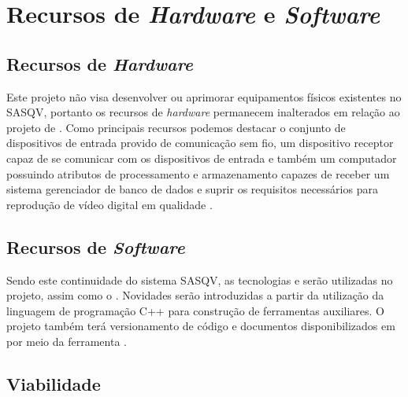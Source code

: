 \chapter{Recursos de \emph{Hardware} e \emph{Software}}

\section{Recursos de \emph{Hardware}}

Este projeto não visa desenvolver ou aprimorar equipamentos físicos existentes no SASQV, portanto os recursos de \emph{hardware} permanecem inalterados em relação ao projeto de \cite{sasqv}. Como principais recursos podemos destacar o conjunto de dispositivos de entrada provido de comunicação sem fio, um dispositivo receptor capaz de se comunicar com os dispositivos de entrada e também um computador possuindo atributos de processamento e armazenamento capazes de receber um sistema gerenciador de banco de dados e suprir os requisitos necessários para reprodução de vídeo digital em qualidade .

\section{Recursos de \emph{Software}}

Sendo este continuidade do sistema SASQV, as tecnologias \cite{java} e \cite{mysql} serão utilizadas no projeto, assim como o  \cite{eclipse}. Novidades serão introduzidas a partir da utilização da linguagem de programação C++ para construção de ferramentas auxiliares. O projeto também terá versionamento de código e documentos disponibilizados em \cite{githubcode, githubdoc} por meio da ferramenta \cite{git}.

\section{Viabilidade}
